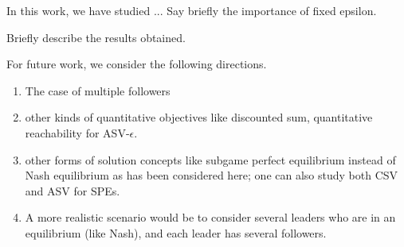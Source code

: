 In this work, we have studied ... Say briefly the importance of fixed epsilon.

Briefly describe the results obtained.

For future work, we consider the following directions.
\begin{enumerate}
    \item The case of multiple followers
    \item other kinds of quantitative objectives like discounted sum, quantitative reachability for ASV-$\epsilon$.
    \item other forms of solution concepts like subgame perfect equilibrium instead of Nash equilibrium as has been considered here; one can also study both CSV and ASV for SPEs.
    \item A more realistic scenario would be to consider several leaders who are in an equilibrium (like Nash), and each leader has several followers.
\end{enumerate}